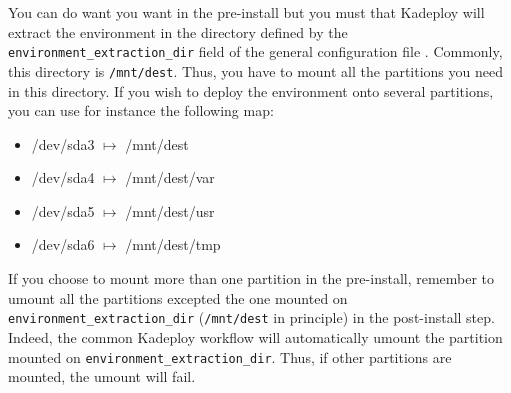 \documentclass[a4wide,10pt,oneside]{book}
\begin{document}
You can do want you want in the pre-install but you must that Kadeploy will extract the environment in the directory defined by the \texttt{environment\_extraction\_dir} field of the general configuration file%
. Commonly, this directory is \texttt{/mnt/dest}. Thus, you have to mount all the partitions you need in this directory. If you wish to deploy the environment onto several partitions, you can use for instance the following map:
\begin{itemize}
\item /dev/sda3 $\mapsto$ /mnt/dest
\item /dev/sda4 $\mapsto$ /mnt/dest/var
\item /dev/sda5 $\mapsto$ /mnt/dest/usr
\item /dev/sda6 $\mapsto$ /mnt/dest/tmp
\end{itemize}

If you choose to mount more than one partition in the pre-install, remember to umount all the partitions excepted the one mounted on \texttt{environment\_extraction\_dir} (\texttt{/mnt/dest} in principle) in the post-install step. Indeed, the common Kadeploy workflow will automatically umount the partition mounted on \texttt{environment\_extraction\_dir}. Thus, if other partitions are mounted, the umount will fail.
\end{document}
